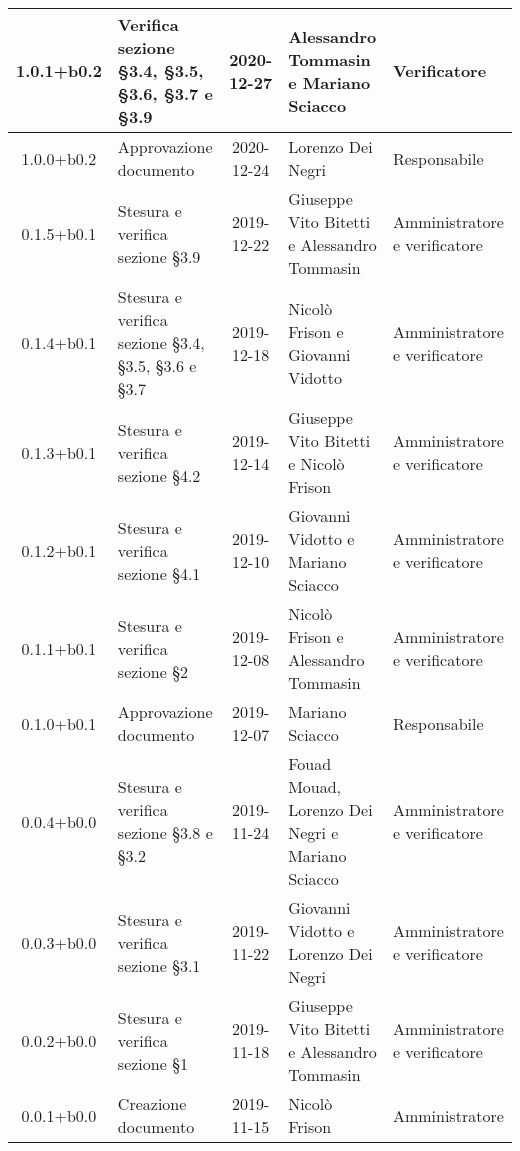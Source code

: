 \begin{center}
\begin{longtable}{|c|p{3.5cm}|c|p{3cm}|p{3cm}|}
	\hline
	1.0.1+b0.2 & Verifica sezione \S3.4, \S3.5, \S3.6, \S3.7 e \S3.9 & 2020-12-27 & Alessandro Tommasin e Mariano Sciacco & Verificatore\\
  \hline
	1.0.0+b0.2 & Approvazione documento & 2020-12-24 & Lorenzo Dei Negri & Responsabile \\
	\hline
	0.1.5+b0.1 & Stesura e verifica sezione \S3.9 & 2019-12-22 & Giuseppe Vito Bitetti e Alessandro Tommasin  & Amministratore e verificatore \\
	\hline
	0.1.4+b0.1 & Stesura e verifica sezione \S3.4, \S3.5, \S3.6 e \S3.7 & 2019-12-18 & Nicolò Frison e Giovanni Vidotto & Amministratore e verificatore \\
	\hline
	0.1.3+b0.1 & Stesura e verifica sezione \S4.2 & 2019-12-14 & Giuseppe Vito Bitetti e Nicolò Frison & Amministratore e verificatore \\
	\hline
	0.1.2+b0.1 & Stesura e verifica sezione \S4.1 & 2019-12-10 & Giovanni Vidotto e Mariano Sciacco & Amministratore e verificatore \\
	\hline
	0.1.1+b0.1 & Stesura e verifica sezione \S2  & 2019-12-08 & Nicolò Frison e Alessandro Tommasin & Amministratore e verificatore \\
	\hline
	0.1.0+b0.1 & Approvazione documento & 2019-12-07 & Mariano Sciacco & Responsabile \\
	\hline
	0.0.4+b0.0 & Stesura e verifica sezione \S3.8 e \S3.2 & 2019-11-24 & Fouad Mouad, Lorenzo Dei Negri e Mariano Sciacco & Amministratore e verificatore \\
	\hline
	0.0.3+b0.0 & Stesura e verifica sezione \S3.1 & 2019-11-22 & Giovanni Vidotto e Lorenzo Dei Negri & Amministratore e verificatore \\
	\hline
	0.0.2+b0.0 & Stesura e verifica sezione \S1 & 2019-11-18 & Giuseppe Vito Bitetti e Alessandro Tommasin & Amministratore e verificatore \\
	\hline
	0.0.1+b0.0 & Creazione documento & 2019-11-15 & Nicolò Frison & Amministratore  \\
	\hline

	\end{longtable}
\end{center}
